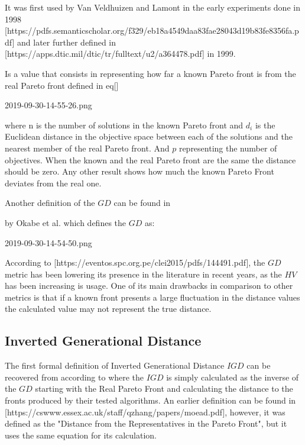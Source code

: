 It was first used by Van Veldhuizen and Lamont in the early experiments done in 1998 [https://pdfs.semanticscholar.org/f329/eb18a4549daa83fae28043d19b83fe8356fa.pdf] and later further defined in [https://apps.dtic.mil/dtic/tr/fulltext/u2/a364478.pdf] in 1999.

Is a value that consists in representing how far a known Pareto front is from the real Pareto front defined in eq[]


2019-09-30-14-55-26.png

where n is the number of solutions in the known Pareto front and $d_i$ is the Euclidean distance in the objective space between each of the solutions and the nearest member of the real Pareto front. And $p$ representing the number of objectives. When the known and the real Pareto front are the same the distance should be zero. Any other result shows how much the known Pareto Front deviates from the real one. 

Another definition of the $GD$ can be found in %

by Okabe et al. which defines the $GD$ as:


2019-09-30-14-54-50.png

According to [https://eventos.spc.org.pe/clei2015/pdfs/144491.pdf], the $GD$ metric has been lowering its presence in the literature in recent years, as the $HV$ has been increasing is usage. One of its main drawbacks in comparison to other metrics is that if a known front presents a large fluctuation in the distance values the calculated value may not represent the true distance.

\subsection{Inverted Generational Distance}

The first formal definition of Inverted Generational Distance $IGD$ can be recovered from 
according to 
where the $IGD$ is simply calculated as the inverse of the $GD$ starting with the Real Pareto Front and calculating the distance to the fronts produced by their tested algorithms. An earlier definition can be found in [https://cswww.essex.ac.uk/staff/qzhang/papers/moead.pdf], however, it was defined as the "Distance from the Representatives in the Pareto Front", but it uses the same equation for its calculation.

